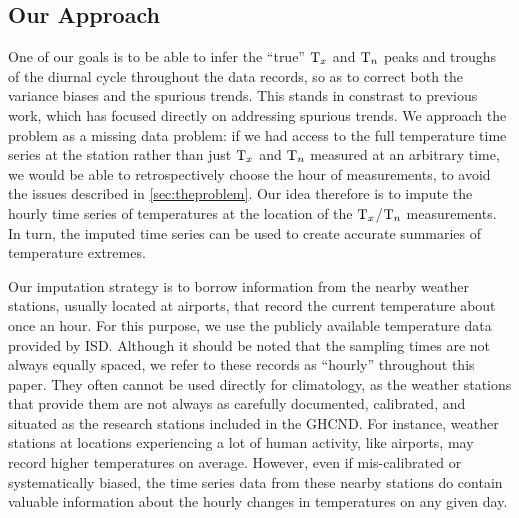 \documentclass[12pt]{article}
\begin{document}
    


\subsection{Our Approach}\label{sec:approach}
    
One of our goals is to be able to infer the ``true'' \(\mathrm{T}_{x}\) and \(\mathrm{T}_{n}\) peaks and troughs of the diurnal cycle throughout the data records, so as to correct both the variance biases and the spurious trends.
This stands in constrast to previous work, which has focused directly on addressing spurious trends.
We approach the problem as a missing data problem: 
if we had access to the full temperature time series at the station rather than just \(\mathrm{T}_{x}\) and \(\mathrm{T}_{n}\) measured at an arbitrary time, 
we would be able to retrospectively choose the hour of measurements, to avoid the issues described in \autoref{sec:theproblem}.
Our idea therefore is to impute the hourly time series of temperatures
at the location of the \(\mathrm{T}_{x}\)/\(\mathrm{T}_{n}\) measurements.
In turn, the imputed time series can be used to create accurate summaries of temperature extremes.

Our imputation strategy is to borrow information from the nearby weather stations, usually located at airports, that record the current temperature about once an hour.
For this purpose, we use the publicly available temperature data provided by ISD.
Although it should be noted that the sampling times are not always equally spaced, we refer to these records as ``hourly'' throughout this paper.
They often cannot be used directly for climatology, as the weather stations that provide them are not always as carefully documented, calibrated, and situated as the research stations included in the GHCND. 
For instance, weather stations at locations experiencing a lot of human activity, like airports, may record higher temperatures on average.
However, even if mis-calibrated or systematically biased, the time series data from these nearby stations do contain valuable information about the hourly changes in temperatures on any given day.
\end{document}

